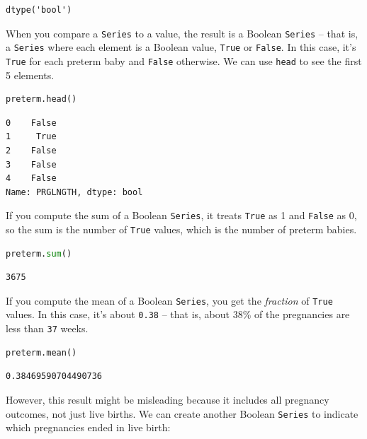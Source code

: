 \begin{lstlisting}[style=output]
dtype('bool')
\end{lstlisting}

When you compare a \passthrough{\lstinline!Series!} to a value, the
result is a Boolean \passthrough{\lstinline!Series!} -- that is, a
\passthrough{\lstinline!Series!} where each element is a Boolean value,
\passthrough{\lstinline!True!} or \passthrough{\lstinline!False!}. In
this case, it's \passthrough{\lstinline!True!} for each preterm baby and
\passthrough{\lstinline!False!} otherwise. We can use
\passthrough{\lstinline!head!} to see the first 5 elements.

\begin{lstlisting}[language=Python,style=source]
preterm.head()
\end{lstlisting}

\begin{lstlisting}[style=output]
0    False
1     True
2    False
3    False
4    False
Name: PRGLNGTH, dtype: bool
\end{lstlisting}

If you compute the sum of a Boolean \passthrough{\lstinline!Series!}, it
treats \passthrough{\lstinline!True!} as 1 and
\passthrough{\lstinline!False!} as 0, so the sum is the number of
\passthrough{\lstinline!True!} values, which is the number of preterm
babies.

\begin{lstlisting}[language=Python,style=source]
preterm.sum()
\end{lstlisting}

\begin{lstlisting}[style=output]
3675
\end{lstlisting}

If you compute the mean of a Boolean \passthrough{\lstinline!Series!},
you get the \emph{fraction} of \passthrough{\lstinline!True!} values. In
this case, it's about \passthrough{\lstinline!0.38!} -- that is, about
38\% of the pregnancies are less than \passthrough{\lstinline!37!}
weeks.

\begin{lstlisting}[language=Python,style=source]
preterm.mean()
\end{lstlisting}

\begin{lstlisting}[style=output]
0.38469590704490736
\end{lstlisting}

However, this result might be misleading because it includes all
pregnancy outcomes, not just live births. We can create another Boolean
\passthrough{\lstinline!Series!} to indicate which pregnancies ended in
live birth:

